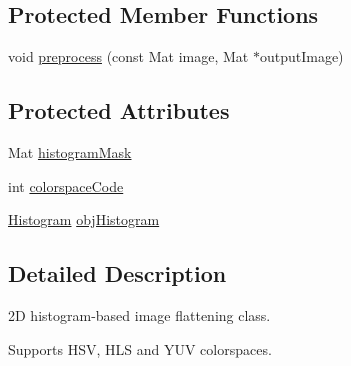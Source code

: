 \subsection*{\-Protected \-Member \-Functions}
\begin{DoxyCompactItemize}
\item 
void \hyperlink{classColorHistBackProject_a7c164c0505ebeba18304157886278c7c}{preprocess} (const \-Mat image, \-Mat $\ast$output\-Image)
\end{DoxyCompactItemize}
\subsection*{\-Protected \-Attributes}
\begin{DoxyCompactItemize}
\item 
\-Mat \hyperlink{classColorHistBackProject_a0026829cd3ae014ee1c59f82b18f93b2}{histogram\-Mask}
\item 
int \hyperlink{classColorHistBackProject_a93f35d7cce470d9a6f70666dc4772d1e}{colorspace\-Code}
\item 
\hyperlink{classHistogram}{\-Histogram} \hyperlink{classColorHistBackProject_a08e48d973198cad49099033b69350928}{obj\-Histogram}
\end{DoxyCompactItemize}


\subsection{\-Detailed \-Description}
2\-D histogram-\/based image flattening class. 

\-Supports \-H\-S\-V, \-H\-L\-S and \-Y\-U\-V colorspaces. 


